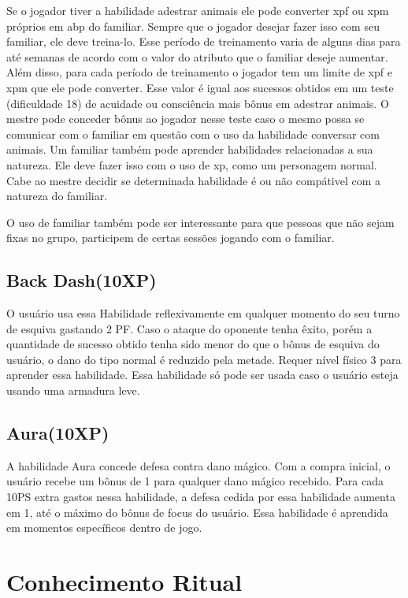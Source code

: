 Se o jogador tiver a habilidade adestrar animais ele pode converter xpf ou xpm próprios em abp do familiar. Sempre que o jogador desejar fazer isso com seu familiar, ele deve treina-lo. Esse período de treinamento varia de alguns dias para até semanas de acordo com o valor do atributo que o familiar deseje aumentar. Além disso, para cada período de treinamento o jogador tem um limite de xpf e xpm que ele pode converter. Esse valor é igual aos sucessos obtidos em um teste (dificuldade 18) de acuidade ou consciência mais bônus em adestrar animais. O mestre pode conceder bônus ao jogador nesse teste caso o mesmo possa se comunicar com o familiar em questão com o uso da habilidade conversar com animais. Um familiar também pode aprender habilidades relacionadas a sua natureza. Ele deve fazer isso com o uso de xp, como um personagem normal. Cabe ao mestre decidir se determinada habilidade é ou não compátivel com a natureza do familiar.

O uso de familiar também pode ser interessante para que pessoas que não sejam fixas no grupo, participem de certas sessões jogando com o familiar.



\subsection {Back Dash(10XP)}
O usuário usa essa Habilidade reflexivamente em qualquer momento do seu turno de esquiva gastando 2 PF. Caso o ataque do oponente tenha êxito, porém a quantidade de sucesso obtido tenha sido menor do que o bônus de esquiva do usuário, o dano do tipo normal é reduzido pela metade. Requer nível físico 3 para aprender essa habilidade. Essa habilidade só pode ser usada caso o usuário esteja usando uma armadura leve.

\subsection {Aura(10XP)}
A habilidade Aura concede defesa contra dano mágico. Com a compra inicial, o usuário recebe um bônus de 1 para qualquer dano mágico recebido. Para cada 10PS extra gastos nessa habilidade, a defesa cedida por essa habilidade aumenta em 1, até o máximo do bônus de focus do usuário. Essa habilidade é aprendida em momentos específicos dentro de jogo.


 
 \section{Conhecimento Ritual}
 
